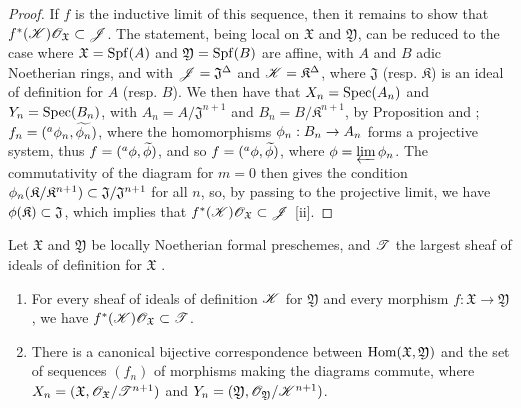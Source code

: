 \begin{proof}
\label{proof-1.10.6.9}
If $f$ is the inductive limit of this sequence, then it remains to show that $f^*(\mathscr{K})\mathscr{O}_\mathfrak{X}\subset\mathscr{J}$.
The statement, being local on $\mathfrak{X}$ and $\mathfrak{Y}$, can be reduced to the case where $\mathfrak{X}=\operatorname{Spf}(A)$ and $\mathfrak{Y}=\operatorname{Spf}(B)$ are affine, with $A$ and $B$ adic Noetherian rings, and with $\mathscr{J}=\mathfrak{J}^\Delta$ and $\mathscr{K}=\mathfrak{K}^\Delta$, where $\mathfrak{J}$ (resp. $\mathfrak{K}$) is an ideal of definition for $A$ (resp. $B$).
We then have that $X_n=\operatorname{Spec}(A_n)$ and $Y_n=\operatorname{Spec}(B_n)$, with $A_n=A/\mathfrak{J}^{n+1}$ and $B_n=B/\mathfrak{K}^{n+1}$, by Proposition  and ; $f_n=({}^a\phi_n,\widetilde{\phi_n})$, where the homomorphisms $\vphi_n:B_n\to A_n$ forms a projective system, thus $f=({}^a\phi,\widetilde{\phi})$, and so $f=({}^a\phi,\widetilde{\phi})$, where $\phi=\varprojlim\phi_n$.
The commutativity of the diagram  for $m=0$ then gives the condition $\phi_n(\mathfrak{K}/\mathfrak{K}^{n+1})\subset\mathfrak{J}/\mathfrak{J}^{n+1}$ for all $n$, so, by passing to the projective limit, we have $\phi(\mathfrak{K})\subset\mathfrak{J}$, which implies that $f^*(\mathscr{K})\mathscr{O}_\mathfrak{X}\subset\mathscr{J}$ [ii].
\end{proof}

\begin{corollary}[10.6.10]
\label{1.10.6.10}
Let $\mathfrak{X}$ and $\mathfrak{Y}$ be locally Noetherian formal preschemes, and $\mathscr{T}$ the largest sheaf of ideals of definition for $\mathfrak{X}$ .
\begin{enumerate}[label=\emph{(\roman*)}]
  \item For every sheaf of ideals of definition $\mathscr{K}$ for $\mathfrak{Y}$ and every morphism $f:\mathfrak{X}\to\mathfrak{Y}$, we have $f^*(\mathscr{K})\mathscr{O}_\mathfrak{X}\subset\mathscr{T}$.
  \item There is a canonical bijective correspondence between $\operatorname{Hom}(\mathfrak{X},\mathfrak{Y})$ and the set of sequences $(f_n)$ of morphisms making the diagrams  commute, where $X_n=(\mathfrak{X},\mathscr{O}_\mathfrak{X}/\mathscr{T}^{n+1})$ and $Y_n=(\mathfrak{Y},\mathscr{O}_\mathfrak{Y}/\mathscr{K}^{n+1})$.
\end{enumerate}
\end{corollary}


